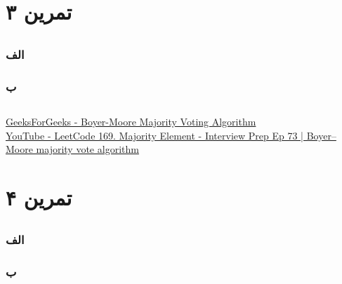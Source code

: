 \documentclass[]{article}
\begin{document}
\pagebreak
\section*{تمرین ۳}

\subsection*{\color{blue}{جواب}}
\subsubsection*{الف}

\subsubsection*{ب}


\subsection*{\color{red}{مراجع}}
\begin{latin}
\href{https://www.geeksforgeeks.org/boyer-moore-majority-voting-algorithm/}{GeeksForGeeks - Boyer-Moore Majority Voting Algorithm}\\
\href{https://youtu.be/M1IL4hz0QrE?si=tl96B7firup1wRac}{YouTube - LeetCode 169. Majority Element - Interview Prep Ep 73 | Boyer–Moore majority vote algorithm}
\end{latin}
\pagebreak
\section*{تمرین ۴}

\subsection*{\color{blue}{جواب}}
\subsubsection*{الف}

\subsubsection*{ب}


\subsection*{\color{red}{مراجع}}
\end{document}
